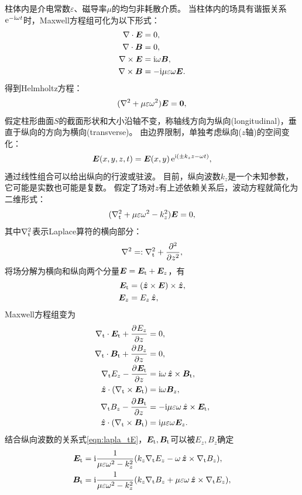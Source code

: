 柱体内是介电常数$\varepsilon$、磁导率$\mu$的均匀非耗散介质。
当柱体内的场具有谐振关系$\e{-\i\omega t}$时，Maxwell方程组可化为以下形式：
\begin{subequations}
    \begin{align}
        \div\bm E&=0,\\
        \div\bm B&=0,\\
        \curl\bm E&=\i\omega\bm B,\\
        \curl\bm B&=-\i\mu\varepsilon\omega\bm E.
    \end{align}
\end{subequations}
得到Helmholtz方程：
\[
    (\lapla+\mu\varepsilon\omega^2)\bm E=\bm 0,
\]
假定柱形曲面$S$的截面形状和大小沿轴不变，称轴线方向为纵向(longitudinal)，垂直于纵向的方向为横向(transverse)。
由边界限制，单独考虑纵向($z$轴)的空间变化：
\[
    \bm E(x,y,z,t)=\bm E(x,y)\e{\i(\pm k_zz-\omega t)},
\]
通过线性组合可以给出纵向的行波或驻波。
目前，纵向波数$k_z$是一个未知参数，它可能是实数也可能是复数。
假定了场对$z$有上述依赖关系后，波动方程就简化为二维形式：
\begin{equation}
    \label{eqn:lapla_tE}
    (\lapla_\t+\mu\varepsilon\omega^2-k_z^2)\bm E=0,
\end{equation}
其中$\lapla_\t$表示Laplace算符的横向部分：
\[
    \lapla=:\lapla_\t+\pp[2]z,
\]
将场分解为横向和纵向两个分量$\bm E=\bm E_\t+\bm E_z$，有
\begin{subequations}
    \begin{align}
        \bm E_\t&=(\uvec z\times\bm E)\times\uvec z,\\
        \bm E_z&=E_z\uvec z,
    \end{align}
\end{subequations}
Maxwell方程组变为
\begin{subequations}
    \label{eqn:EtEzBtBz}
    \begin{align}
        \nabla_\t\cdot\bm E_\t+\pv{E_z}z&=0,\\
        \nabla_\t\cdot\bm B_\t+\pv{B_z}z&=0,\\
        \nabla_\t E_z-\pv{\bm E_\t}z&=\i\omega\uvec z\times\bm B_\t,\\
        \uvec z\cdot(\nabla_\t\times\bm E_\t)&=\i\omega\bm B_z,\\
        \nabla_\t B_z-\pv{\bm B_\t}z&=-\i\mu\varepsilon\omega\uvec z\times\bm E_\t,\\
        \uvec z\cdot(\nabla_\t\times\bm B_\t)&=\i\mu\varepsilon\omega\bm E_z.
    \end{align}
\end{subequations}
结合纵向波数的关系式\eqref{eqn:lapla_tE}，$\bm E_\t,\bm B_\t$可以被$E_z,B_z$确定
\begin{subequations}
    \label{eqn:EtBt=EzBz}
    \begin{align}
        \label{eqn:Et=EzBz}
        \bm E_\t&=\i\frac1{\mu\varepsilon\omega^2-k_z^2}(k_z\nabla_\t E_z-\omega\uvec z\times\nabla_\t B_z),\\
        \label{eqn:Bt=EzBz}
        \bm B_\t&=\i\frac1{\mu\varepsilon\omega^2-k_z^2}(k_z\nabla_\t B_z+\mu\varepsilon\omega\uvec z\times\nabla_\t E_z),
    \end{align}
\end{subequations}

